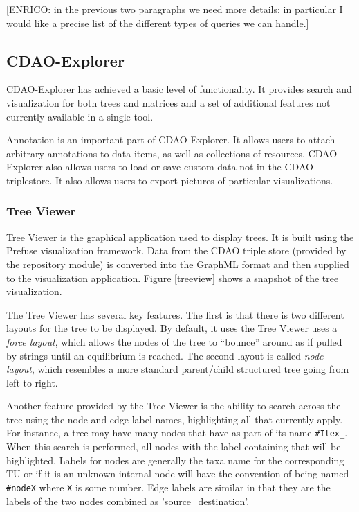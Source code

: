 \documentclass[10pt]{bmc_article}
\newenvironment{bmcformat}{\fussy\setboolean{publ}{true}}{\fussy}
\begin{document}
\begin{bmcformat}
[ENRICO: in the previous two paragraphs we need more details; in particular I 
would like a precise list of the different types of queries we can handle.]
  
  
  
  \subsection*{CDAO-Explorer}
  CDAO-Explorer has achieved a basic level of functionality. It provides search
and visualization for both trees and matrices and a set of additional features
not currently available in a single tool. 
  
  Annotation is an important part of CDAO-Explorer. It allows users to attach
arbitrary annotations to data items, as well as collections of resources.
CDAO-Explorer also allows users to load or save custom data not in the
CDAO-triplestore. It also allows users to export pictures of particular
visualizations. 

\subsubsection*{Tree Viewer}
Tree Viewer is the graphical application used to display trees.  It is built using the
 Prefuse visualization framework. Data from the CDAO triple store (provided by
 the repository module) is
converted into the GraphML format \cite{graphml}
and then supplied to the  visualization application.  Figure \ref{treeview} shows
a snapshot of the tree visualization.

The Tree Viewer has several 
key features.  The first is that there is two different layouts for the tree to
be displayed.  By default, it uses the Tree Viewer uses a
\emph{force layout}, which allows the nodes of the
tree to ``bounce'' around as if pulled by strings until an equilibrium is reached.
The second  layout is called \emph{node layout}, which resembles a more standard parent/child
structured tree going from left to right.  

Another feature provided by the Tree Viewer
is the ability  to search across the tree using the node and edge label names,
highlighting all that currently apply.  For instance, a tree may have many
nodes that have as part of its name \verb|#Ilex_|.  When this search is performed,
all nodes with the label containing that will be highlighted.  Labels for nodes
are generally the taxa name for the corresponding TU or if it is an unknown internal node
will have the convention of being named \verb|#nodeX| where \verb|X| is some number.  Edge
labels are similar in that they are the labels of the two nodes combined as
'source\_destination'.  


\end{bmcformat}
\end{document}
